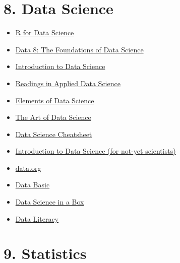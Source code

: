 \documentclass[
  letterpaper,
  DIV=11,
  numbers=noendperiod]{scrreprt}
\providecommand{\tightlist}{%
  \setlength{\itemsep}{0pt}\setlength{\parskip}{0pt}}\usepackage{longtable,booktabs,array}
\begin{document}
\section{8. Data Science}\label{data-science}

\begin{itemize}
\tightlist
\item
  \href{https://r4ds.hadley.nz/}{R for Data Science}
\item
  \href{https://www.data8.org/}{Data 8: The Foundations of Data Science}
\item
  \href{https://sml201.github.io/}{Introduction to Data Science}
\item
  \href{https://github.com/hadley/stats337}{Readings in Applied Data
  Science}
\item
  \href{https://github.com/AllenDowney/ElementsOfDataScience}{Elements
  of Data Science}
\item
  \href{https://bookdown.org/rdpeng/artofdatascience/}{The Art of Data
  Science}
\item
  \href{https://github.com/ml874/Data-Science-Cheatsheet}{Data Science
  Cheatsheet}
\item
  \href{https://florian-huber.github.io/data_science_course/book/cover.html}{Introduction
  to Data Science (for not-yet scientists)}
\item
  \href{https://data.org/}{data.org}
\item
  \href{https://databasic.io/en/}{Data Basic}
\item
  \href{https://datasciencebox.org/}{Data Science in a Box}
\item
  \href{http://dataliteracy.rbind.io/}{Data Literacy}
\end{itemize}

\section{9. Statistics}\label{statistics}
\end{document}
